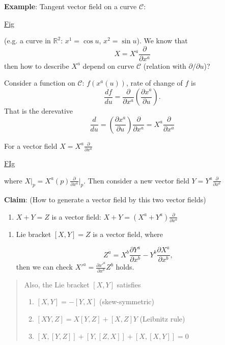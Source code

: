 \textbf{Example}: Tangent vector field on a curve $\mathcal{C}$:

\underline{Fig}

(e.g. a curve in $\mathbb{R}^2$: $x^{1}=\cos u$, $x^{2}=\sin u$). We know that
\begin{equation}
X = X^{a}\frac{\partial}{\partial x^{a}}
\end{equation}
then how to describe $X^{a}$ depend on curve $\mathcal{C}$ (relation with $\partial/\partial u$)?

Consider a function on $\mathcal{C}$: $f(x^{a}(u))$, rate of change of $f$ is
\begin{equation}
\frac{df}{du} = \frac{\partial}{\partial x^{a}}\left(\frac{\partial x^{a}}{\partial u}\right).
\end{equation}
That is the derevative
\begin{equation}
\frac{d}{du} =\left(\frac{\partial x^{a}}{\partial u}\right)\frac{\partial}{\partial x^{a}} = X^{a}\frac{\partial}{\partial x^{a}}
\end{equation}



For a vector field $X\displaystyle  = X^{a}\frac{\partial}{\partial x^{a}}$

\underline{FIg}

where $\displaystyle X\bigg|_{p} = X^{a}(p)\frac{\partial}{\partial x^{a}}\bigg|_p$. Then consider a new vector field $\displaystyle Y = Y^{a}\frac{\partial}{\partial x^{a}}$

\textbf{Claim}: (How to generate a vector field by this two vector fields)

\begin{enumerate}
	\item $X+Y=Z$  is a vector field: $\displaystyle X+Y=\left(X^{a}+Y^{a}\right)\frac{\partial}{\partial x^{a}}$

\end{enumerate}
\begin{enumerate}
	\item Lie bracket $[X,Y] = Z$ is a vector field, where

\begin{equation}
Z^{a} = X^{b}\frac{\partial Y^{a}}{\partial x^{b}} - Y^{b}\frac{\partial X^{a}}{\partial x^{b}},
\end{equation}
    then we can check $\displaystyle X'^{a} = \frac{\partial x'^{a}}{\partial x^{b}}Z^{b}$ holds.

\end{enumerate}
\begin{quote}
	Also, the Lie bracket $[X,Y]$ satisfies
\begin{enumerate}
	\item $[X,Y] = -[Y,X]$ (skew-symmetric)
	\item $[XY,Z] = X[Y,Z] + [X,Z]Y$ (Leibnitz rule)
	\item $[X,[Y,Z]] + [Y,[Z,X]]+[X,[X,Y]] = 0$

\end{enumerate}

\end{quote}

